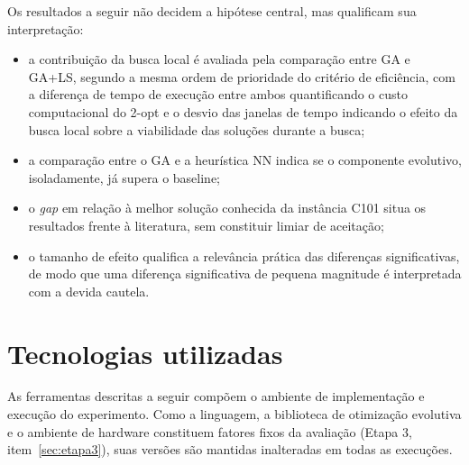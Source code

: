 \begin{alineas}
	Os resultados a seguir não decidem a hipótese central, mas qualificam sua
	interpretação:

	\begin{itemize}
		\item a contribuição da busca local é avaliada pela comparação entre GA e GA+LS,
		segundo a mesma ordem de prioridade do critério de eficiência, com a diferença de
		tempo de execução entre ambos quantificando o custo computacional do 2-opt e o
		desvio das janelas de tempo indicando o efeito da busca local sobre a
		viabilidade das soluções durante a busca;
		\item a comparação entre o GA e a heurística NN indica se o componente evolutivo,
		isoladamente, já supera o baseline;
		\item o \textit{gap} em relação à melhor solução conhecida da instância C101 situa
		os resultados frente à literatura, sem constituir limiar de aceitação;
		\item o tamanho de efeito qualifica a relevância prática das diferenças
		significativas, de modo que uma diferença significativa de pequena magnitude é
		interpretada com a devida cautela.
	\end{itemize}
\end{alineas}

\section{Tecnologias utilizadas}
\label{sec:tecnologias}

As ferramentas descritas a seguir compõem o ambiente de implementação e execução do
experimento. Como a linguagem, a biblioteca de otimização evolutiva e o ambiente de
hardware constituem fatores fixos da avaliação (Etapa 3, item~\ref{sec:etapa3}), suas
versões são mantidas inalteradas em todas as execuções.

